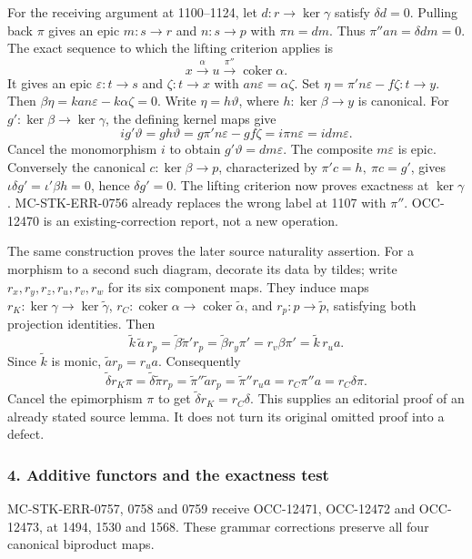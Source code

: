 \documentclass[11pt]{article}
\begin{document}
For the receiving argument at 1100--1124, let \(d:r\to\ker\gamma\) satisfy \(\delta d=0\). Pulling back \(\pi\) gives an epic \(m:s\to r\) and \(n:s\to p\) with \(\pi n=dm\). Thus \(\pi''an=\delta dm=0\). The exact sequence to which the lifting criterion applies is \[
x\xrightarrow{\alpha}u\xrightarrow{\pi''}\operatorname{coker}\alpha.
\] It gives an epic \(\varepsilon:t\to s\) and \(\zeta:t\to x\) with \(an\varepsilon=\alpha\zeta\). Set \(\eta=\pi'n\varepsilon-f\zeta:t\to y\). Then \(\beta\eta=kan\varepsilon-k\alpha\zeta=0\). Write \(\eta=h\vartheta\), where \(h:\ker\beta\to y\) is canonical. For \(g':\ker\beta\to\ker\gamma\), the defining kernel maps give \[
ig'\vartheta=gh\vartheta
=g\pi'n\varepsilon-gf\zeta
=i\pi n\varepsilon=idm\varepsilon.
\] Cancel the monomorphism \(i\) to obtain \(g'\vartheta=dm\varepsilon\). The composite \(m\varepsilon\) is epic. Conversely the canonical \(c:\ker\beta\to p\), characterized by \(\pi'c=h,\ \pi c=g'\), gives \(\iota\delta g'=\iota'\beta h=0\), hence \(\delta g'=0\). The lifting criterion now proves exactness at \(\ker\gamma\). MC-STK-ERR-0756 already replaces the wrong label at 1107 with \(\pi''\). OCC-12470 is an existing-correction report, not a new operation.

The same construction proves the later source naturality assertion. For a morphism to a second such diagram, decorate its data by tildes; write \(r_x,r_y,r_z,r_u,r_v,r_w\) for its six component maps. They induce maps \(r_K:\ker\gamma\to\ker\widetilde\gamma\), \(r_C:\operatorname{coker}\alpha\to\operatorname{coker}\widetilde\alpha\), and \(r_p:p\to\widetilde p\), satisfying both projection identities. Then \[
\widetilde k\,\widetilde a\,r_p
=\widetilde\beta\widetilde\pi' r_p
=\widetilde\beta r_y\pi'
=r_v\beta\pi'
=\widetilde k\,r_u a.
\] Since \(\widetilde k\) is monic, \(\widetilde a r_p=r_u a\). Consequently \[
\widetilde\delta r_K\pi
=\widetilde\delta\widetilde\pi r_p
=\widetilde\pi''\widetilde a r_p
=\widetilde\pi''r_u a
=r_C\pi''a=r_C\delta\pi.
\] Cancel the epimorphism \(\pi\) to get \(\widetilde\delta r_K=r_C\delta\). This supplies an editorial proof of an already stated source lemma. It does not turn its original omitted proof into a defect.

\subsubsection{4. Additive functors and the exactness test}\label{additive-functors-and-the-exactness-test}

MC-STK-ERR-0757, 0758 and 0759 receive OCC-12471, OCC-12472 and OCC-12473, at 1494, 1530 and 1568. These grammar corrections preserve all four canonical biproduct maps.
\end{document}
